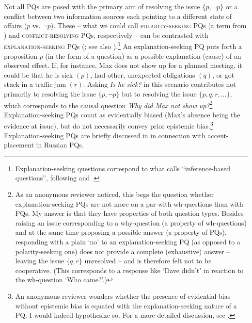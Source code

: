 \documentclass[output=paper,colorlinks,citecolor=brown]{langscibook}
\begin{document}
Not all PQs are posed with the primary aim of resolving the issue $\{p,\neg p\}$ or a conflict between two information sources each pointing to a different state of affairs ($p$ vs. $\neg p$). These -- what we could call \textsc{polarity-seeking} PQs (a term from \citealt{Esipova.Romero2023}) and \textsc{conflict-resolving} PQs, respectively -- can be contrasted with \textsc{explanation-seeking} PQs (\citealt{Tomioka.Kim2014,Esipova.Romero2023}; see also \citealt{Korotkova2023}).\footnote{Explanation-seeking questions correspond to what \citet{Logvinova2022} calls ``inference-based questions'', following \citet{Bolinger1978} and \citet{Mehlig1991}.} An explanation-seeking PQ puts forth a proposition $p$ (in the form of a question) as a possible explanation (cause) of an observed effect. If, for instance, Max does not show up for a planned meeting, it could be that he is sick $(p)$, had other, unexpected obligations $(q)$, or got stuck in a traffic jam $(r)$. Asking \textit{Is he sick?} in this scenario contributes not primarily to resolving the issue $\{p,\neg p\}$ but to resolving the issue $\{p,q,r,{\dots}\}$, which corresponds to the causal question \textit{Why did Max not show up?}\footnote{As an anonymous reviewer noticed, this begs the question whether explanation-seeking PQs are not more on a par with wh-questions than with PQs. My answer is that they have properties of both question types. Besides raising an issue corresponding to a why-question (a property of wh-questions) and at the same time proposing a possible answer (a property of PQs), responding with a plain `no' to an explanation-seeking PQ (as opposed to a polarity-seeking one) does not provide a complete (exhaustive) answer -- leaving the issue $\{q,r\}$ unresolved -- and is therefore felt not to be cooperative. (This corresponds to a response like `Dave didn't' in reaction to the wh-question `Who came?'.)\label{sim:fn:expla-wh}} Explanation-seeking PQs count as evidentially biased (Max's absence being the evidence at issue), but do not necessarily convey prior epistemic bias.\footnote{An anonymous reviewer wonders whether the presence of evidential bias without epistemic bias is equated with the explanation-seeking nature of a PQ. I would indeed hypothesize so. For a more detailed discussion, see .\label{sim:fn:evid-expla}} Explanation-seeking PQs are briefly discussed in  in connection with accent-placement in Russian PQs.
\end{document}

